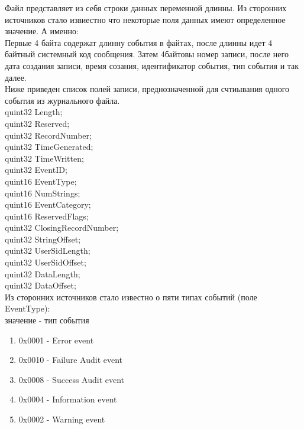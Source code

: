 
Файл представляет из себя строки данных переменной длинны. Из сторонних источников стало извиестно что некоторые поля данных имеют определенное значение. А именно: \\
Первые 4 байта содержат длинну события в файтах, после длинны идет 4 байтный системный код сообщения. Затем 4байтовы номер записи, после него дата создания записи, время созания, идентификатор события, тип события и так далее. \\

Ниже приведен список полей записи, преднозначенной для счтиывания одного события из журнального файла. \\

	quint32 Length; \\
	quint32 Reserved; \\
	quint32 RecordNumber; \\
	quint32 TimeGenerated; \\
	quint32 TimeWritten; \\
	quint32 EventID; \\
	quint16 EventType; \\
	quint16 NumStrings; \\
	quint16 EventCategory; \\
	quint16 ReservedFlags; \\
	quint32 ClosingRecordNumber; \\
	quint32 StringOffset; \\
	quint32 UserSidLength; \\
	quint32 UserSidOffset; \\
	quint32 DataLength; \\
	quint32 DataOffset; \\

Из сторонних источников стало известно о пяти типах событий (поле EventType): \\

значение - тип события \\

\begin{enumerate}
\item 0x0001 - Error event
\item 0x0010 - Failure Audit event
\item 0x0008 - Success Audit event
\item 0x0004 - Information event
\item 0x0002 - Warning event
\end{enumerate}


